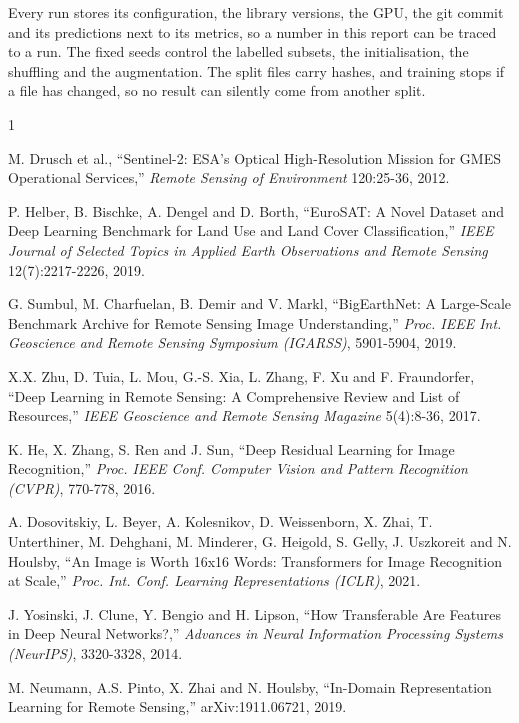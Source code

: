 \documentclass[twoside,a4paper,11pt]{article}
\begin{document}
Every run stores its configuration, the library versions, the GPU, the git commit and its predictions next to its metrics, so a number in this report can be traced to a run. The fixed seeds control the labelled subsets, the initialisation, the shuffling and the augmentation. The split files carry hashes, and training stops if a file has changed, so no result can silently come from another split.

\begin{thebibliography}{1}

M. Drusch et al., ``{Sentinel-2}: {ESA}'s Optical High-Resolution Mission for {GMES} Operational Services,'' {\em Remote Sensing of Environment} 120:25-36, 2012.

P. Helber, B. Bischke, A. Dengel and D. Borth, ``{EuroSAT}: A Novel Dataset and Deep Learning Benchmark for Land Use and Land Cover Classification,'' {\em IEEE Journal of Selected Topics in Applied Earth Observations and Remote Sensing} 12(7):2217-2226, 2019.

G. Sumbul, M. Charfuelan, B. Demir and V. Markl, ``{BigEarthNet}: A Large-Scale Benchmark Archive for Remote Sensing Image Understanding,'' {\em Proc. IEEE Int. Geoscience and Remote Sensing Symposium (IGARSS)}, 5901-5904, 2019.

X.X. Zhu, D. Tuia, L. Mou, G.-S. Xia, L. Zhang, F. Xu and F. Fraundorfer, ``Deep Learning in Remote Sensing: A Comprehensive Review and List of Resources,'' {\em IEEE Geoscience and Remote Sensing Magazine} 5(4):8-36, 2017.

K. He, X. Zhang, S. Ren and J. Sun, ``Deep Residual Learning for Image Recognition,'' {\em Proc. IEEE Conf. Computer Vision and Pattern Recognition (CVPR)}, 770-778, 2016.

A. Dosovitskiy, L. Beyer, A. Kolesnikov, D. Weissenborn, X. Zhai, T. Unterthiner, M. Dehghani, M. Minderer, G. Heigold, S. Gelly, J. Uszkoreit and N. Houlsby, ``An Image is Worth 16x16 Words: Transformers for Image Recognition at Scale,'' {\em Proc. Int. Conf. Learning Representations (ICLR)}, 2021.

J. Yosinski, J. Clune, Y. Bengio and H. Lipson, ``How Transferable Are Features in Deep Neural Networks?,'' {\em Advances in Neural Information Processing Systems (NeurIPS)}, 3320-3328, 2014.

M. Neumann, A.S. Pinto, X. Zhai and N. Houlsby, ``In-Domain Representation Learning for Remote Sensing,'' arXiv:1911.06721, 2019.


\end{thebibliography}
\end{document}
